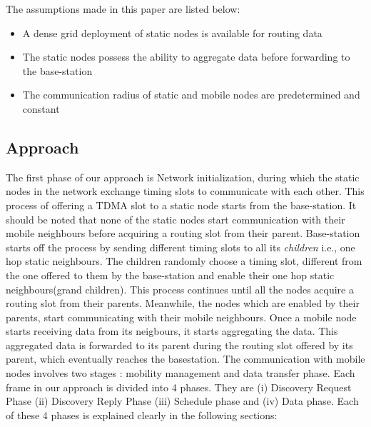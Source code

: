 \documentclass[a4paper, conference, 10pt]{IEEEtran}
\begin{document}
The assumptions made in this paper are listed below:
\begin{itemize}
	\item A dense grid deployment of static nodes is available for routing data
	\item The static nodes possess the ability to aggregate data before forwarding to the base-station
	\item The communication radius of static and mobile nodes are predetermined and constant
\end{itemize}

\subsection{Approach}
\label{algo}

The first phase of our approach is Network initialization, during which the static nodes in the network exchange timing slots to communicate with each other. This process of offering a TDMA slot to a static node starts from the base-station. It should be noted that none of the static nodes start communication with their mobile neighbours before acquiring a routing slot from their parent. Base-station starts off the process by sending different timing slots to all its \emph{children} i.e., one hop static neighbours. The children randomly choose a timing slot, different from the one offered to them by the base-station and enable their one hop static neighbours(grand children). This process continues until all the nodes acquire a routing slot from their parents. Meanwhile, the nodes which are enabled by their parents, start communicating with their mobile neighbours. Once a mobile node starts receiving data from its neigbours, it starts aggregating the data. This aggregated data is forwarded to its parent during the routing slot offered by its parent, which eventually reaches the basestation. The communication with mobile nodes involves two stages : mobility management and data transfer phase. Each frame in our approach is divided into 4 phases. They are (i) Discovery Request Phase (ii) Discovery Reply Phase (iii) Schedule phase and (iv) Data phase. Each of these 4 phases is explained clearly in the following sections:\\
\end{document}

